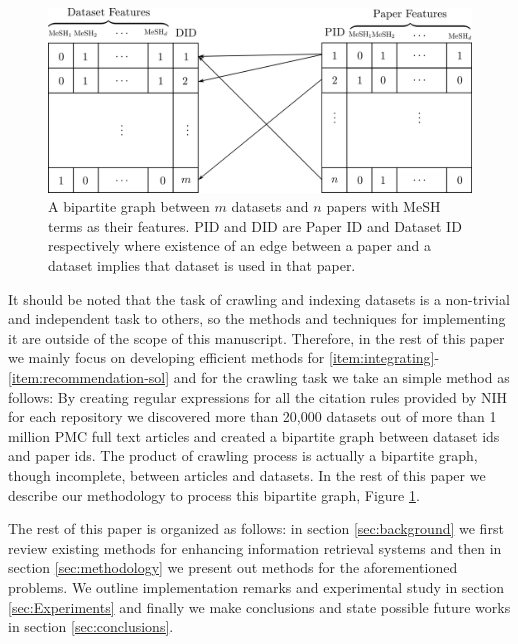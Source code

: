 \documentclass[twoside,11pt]{article}
\begin{document}
\begin{figure}\label{fig:bipartite}
\centering
\includegraphics[scale=0.7]{bipartite.png}
\caption{A bipartite graph between $m$ datasets and $n$ papers with MeSH terms as their features. PID and DID are Paper ID and Dataset ID respectively where existence of an edge between a paper and a dataset implies that dataset is used in that paper.}
\end{figure}

It should be noted that the task of crawling and indexing datasets is a non-trivial and independent task to others, so the methods and techniques for implementing it are outside of the scope of this manuscript. Therefore, in the rest of this paper we mainly focus on developing efficient methods for \eqref{item:integrating}-\eqref{item:recommendation-sol} and for the crawling task we take an simple method as follows: 
By creating regular expressions for all the citation rules provided by NIH for each repository we discovered more than 20,000 datasets out of more than 1 million PMC full text articles and created a bipartite graph between dataset ids and paper ids. The  product of crawling process is actually a bipartite graph, though incomplete, between articles and datasets. In the rest of this paper we describe our methodology to process this bipartite graph, Figure \ref{fig:bipartite}.

The rest of this paper is organized as follows: in section \ref{sec:background} we first review existing methods for enhancing information retrieval systems and then in section \ref{sec:methodology} we present out methods for the aforementioned problems. We outline implementation remarks and experimental study in section \ref{sec:Experiments} and finally we make conclusions and state possible future works in section \ref{sec:conclusions}.
\end{document}
